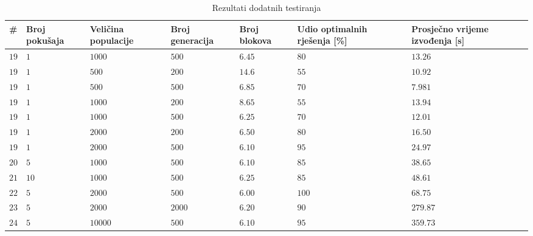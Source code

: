 \documentclass[times, utf8, diplomski]{fer}
\begin{document}
\begin{table}
	\centering
	\caption{Rezultati dodatnih testiranja}
	\label{tab:additional-results}
	\begin{tabular}{
			|>{\centering\arraybackslash}m{4mm}
			|>{\centering\arraybackslash}m{19mm}
			|>{\centering\arraybackslash}m{19mm}
			|>{\centering\arraybackslash}m{19mm}
			|>{\centering\arraybackslash}m{18mm}
			|>{\centering\arraybackslash}m{20mm}
			|>{\centering\arraybackslash}m{18mm}|}
		\hline
		  \textbf{\#}
		& \textbf{Broj \linebreak pokušaja}
		& \textbf{Veličina \linebreak populacije}
		& \textbf{Broj \linebreak generacija}
		& \textbf{Broj \linebreak blokova}
		& \textbf{Udio \linebreak optimalnih \linebreak rješenja [\%]}
		& \textbf{Prosječno vrijeme izvođenja [s]} \\ \hline
		$19$		& $1$	& $1000$	& $500$		& $6.45$	& $80$		& $13.26$	\\ \hline
		$19$		& $1$	& $500$		& $200$		& $14.6$	& $55$		& $10.92$	\\ \hline
		$19$		& $1$	& $500$		& $500$		& $6.85$	& $70$		& $7.981$	\\ \hline
		$19$		& $1$	& $1000$	& $200$		& $8.65$	& $55$		& $13.94$	\\ \hline
		$19$		& $1$	& $1000$	& $500$		& $6.25$	& $70$		& $12.01$	\\ \hline
		$19$		& $1$	& $2000$	& $200$		& $6.50$	& $80$		& $16.50$	\\ \hline
		$19$		& $1$	& $2000$	& $500$		& $6.10$	& $95$		& $24.97$	\\ \hline
		$20$		& $5$	& $1000$	& $500$		& $6.10$	& $85$		& $38.65$	\\ \hline
		$21$		& $10$	& $1000$	& $500$		& $6.25$	& $85$		& $48.61$	\\ \hline
		$22$		& $5$	& $2000$	& $500$		& $6.00$	& $100$		& $68.75$	\\ \hline
		$23$		& $5$	& $2000$	& $2000$	& $6.20$	& $90$		& $279.87$	\\ \hline
		$24$		& $5$	& $10000$	& $500$		& $6.10$	& $95$		& $359.73$	\\ \hline
	\end{tabular}
\end{table}
\end{document}
